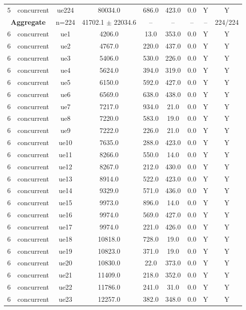 \begin{table}[ht]
\begin{tabular}{|c|c|c|c|c|c|c|c|c|}
5 & concurrent & ue224 & 80034.0 & 686.0 & 423.0 & 0.0 & Y & Y \\
\multicolumn{2}{|c|}{\textbf{Aggregate}} & n=224 & 41702.1 $\pm$ 22034.6 & -- & -- & -- & -- & 224/224 \\
\hline
6 & concurrent & ue1 & 4206.0 & 13.0 & 353.0 & 0.0 & Y & Y \\
6 & concurrent & ue2 & 4767.0 & 220.0 & 437.0 & 0.0 & Y & Y \\
6 & concurrent & ue3 & 5406.0 & 530.0 & 226.0 & 0.0 & Y & Y \\
6 & concurrent & ue4 & 5624.0 & 394.0 & 319.0 & 0.0 & Y & Y \\
6 & concurrent & ue5 & 6150.0 & 592.0 & 427.0 & 0.0 & Y & Y \\
6 & concurrent & ue6 & 6569.0 & 638.0 & 438.0 & 0.0 & Y & Y \\
6 & concurrent & ue7 & 7217.0 & 934.0 & 21.0 & 0.0 & Y & Y \\
6 & concurrent & ue8 & 7220.0 & 583.0 & 19.0 & 0.0 & Y & Y \\
6 & concurrent & ue9 & 7222.0 & 226.0 & 21.0 & 0.0 & Y & Y \\
6 & concurrent & ue10 & 7635.0 & 288.0 & 423.0 & 0.0 & Y & Y \\
6 & concurrent & ue11 & 8266.0 & 550.0 & 14.0 & 0.0 & Y & Y \\
6 & concurrent & ue12 & 8267.0 & 212.0 & 430.0 & 0.0 & Y & Y \\
6 & concurrent & ue13 & 8914.0 & 522.0 & 423.0 & 0.0 & Y & Y \\
6 & concurrent & ue14 & 9329.0 & 571.0 & 436.0 & 0.0 & Y & Y \\
6 & concurrent & ue15 & 9973.0 & 896.0 & 14.0 & 0.0 & Y & Y \\
6 & concurrent & ue16 & 9974.0 & 569.0 & 427.0 & 0.0 & Y & Y \\
6 & concurrent & ue17 & 9974.0 & 221.0 & 426.0 & 0.0 & Y & Y \\
6 & concurrent & ue18 & 10818.0 & 728.0 & 19.0 & 0.0 & Y & Y \\
6 & concurrent & ue19 & 10823.0 & 371.0 & 19.0 & 0.0 & Y & Y \\
6 & concurrent & ue20 & 10830.0 & 22.0 & 373.0 & 0.0 & Y & Y \\
6 & concurrent & ue21 & 11409.0 & 218.0 & 352.0 & 0.0 & Y & Y \\
6 & concurrent & ue22 & 11786.0 & 241.0 & 31.0 & 0.0 & Y & Y \\
6 & concurrent & ue23 & 12257.0 & 382.0 & 348.0 & 0.0 & Y & Y \\

\end{tabular}
\end{table}
